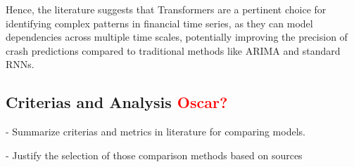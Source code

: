 \documentclass[12pt, letterpaper]{article}
\begin{document}
Hence, the literature suggests that Transformers are a pertinent choice for identifying complex patterns in financial time series, as they can model dependencies across multiple time scales, potentially improving the precision of crash predictions compared to traditional methods like ARIMA and standard RNNs.



\subsection*{Criterias and Analysis \textcolor{red}{Oscar?}}
- Summarize criterias and metrics in literature for comparing models.

- Justify the selection of those comparison methods based on sources

\pagebreak
\printbibliography

\end{document}
